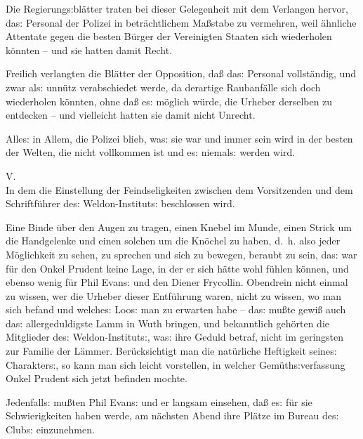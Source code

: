 \documentclass[oneside,12pt]{book}
\newenvironment{antiqua}{\normalfont}{}
\newcommand{\s}{s:}
\begin{document}
Die Regierung{\s}bl\"atter traten bei dieser Gelegenheit mit dem
Verlangen hervor, da{\s} Personal der Polizei in betr\"achtlichem
Ma{\ss}stabe zu vermehren, weil \"ahnliche Attentate gegen die besten
B\"urger der Vereinigten Staaten sich wiederholen k\"onnten -- und
sie hatten damit Recht.

Freilich verlangten die Bl\"atter der Opposition, da{\ss} da{\s}
Personal voll\-st\"andig, und zwar al{\s} unn\"utz verabschiedet werde,
da derartige Raubanf\"alle sich doch wiederholen k\"onnten, ohne
da{\ss} e{\s} m\"oglich w\"urde, die Urheber derselben zu entdecken
-- und vielleicht hatten sie damit nicht Unrecht.

Alle{\s} in Allem, die Polizei blieb, wa{\s} sie war und immer sein
wird in der besten der Welten, die nicht vollkommen ist und e{\s}
niemal{\s} werden wird.



\newpage\begin{center}\label{kap05}
{\large \begin{antiqua}V.\end{antiqua}\\
In dem die Einstellung der Feindseligkeiten zwischen dem Vorsitzenden
und dem Schriftf\"uhrer de{\s} Weldon-Institut{\s} beschlossen
wird.\\\bigskip}
\end{center}



Eine Binde \"uber den Augen zu tragen, einen Knebel im Munde, einen
Strick um die Handgelenke und einen solchen um die Kn\"ochel zu
haben, d.~h. also jeder M\"oglichkeit zu sehen, zu sprechen und sich
zu bewegen, beraubt zu sein, da{\s} war f\"ur den Onkel Prudent keine
Lage, in der er sich h\"atte wohl f\"uhlen k\"onnen, und ebenso wenig
f\"ur Phil Evan{\s} und den Diener Frycollin. Obendrein nicht einmal
zu wissen, wer die Urheber dieser Entf\"uhrung waren, nicht zu
wissen, wo man sich befand und welche{\s} Loo{\s} man zu erwarten
habe -- da{\s} mu{\ss}te gewi{\ss} auch da{\s} allergeduldigste Lamm
in Wuth bringen, und bekanntlich geh\"orten die Mitglieder de{\s}
Weldon-Institut{\s}, wa{\s} ihre Geduld betraf, nicht im geringsten
zur Familie der L\"ammer. Ber\"ucksichtigt man die nat\"urliche
Heftigkeit seine{\s} Charakter{\s}, so kann man sich leicht
vorstellen, in welcher Gem\"uth{\s}verfassung Onkel Prudent sich
jetzt befinden mochte.

Jedenfall{\s} mu{\ss}ten Phil Evan{\s} und er langsam einsehen,
da{\ss} e{\s} f\"ur sie Schwierigkeiten haben werde, am n\"achsten
Abend ihre Pl\"atze im Bureau de{\s} Club{\s} einzunehmen.
\end{document}
